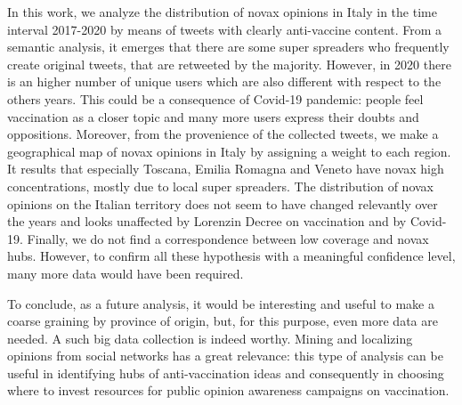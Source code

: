 \documentclass[prb,twocolumn,9pt]{revtex4-1}
\begin{document}
In this work, we analyze the distribution of novax opinions in Italy in the time interval 2017-2020 by means of tweets with clearly anti-vaccine content. From a semantic analysis, it emerges that there are some super spreaders who frequently create original tweets, that are retweeted by the majority. However, in 2020 there is an higher number of unique users which are also different with respect to the others years. This could be a consequence of Covid-19 pandemic: people feel vaccination as a closer topic and many more users express their doubts and oppositions. 
Moreover, from the provenience of the collected tweets, we make a geographical map of novax opinions in Italy by assigning a weight to each region. 
It results that especially Toscana, Emilia Romagna and Veneto have novax high concentrations, mostly due to local super spreaders. 
The distribution of novax opinions on the Italian territory does not seem to have changed relevantly over the years and looks unaffected by Lorenzin Decree on vaccination and by Covid-19. Finally, we do not find a correspondence between low coverage and novax hubs.
However, to confirm all these hypothesis with a meaningful confidence level, many more data would have been required.

To conclude, as a future analysis, it would be interesting and useful to make a coarse graining by province of origin, but, for this purpose, even more data are needed. 
A such big data collection is indeed worthy. Mining and localizing opinions from social networks has a great relevance: this type of analysis can be useful in identifying hubs of anti-vaccination ideas and consequently in choosing where to invest resources for public opinion awareness campaigns on vaccination.




{}
\end{document}
